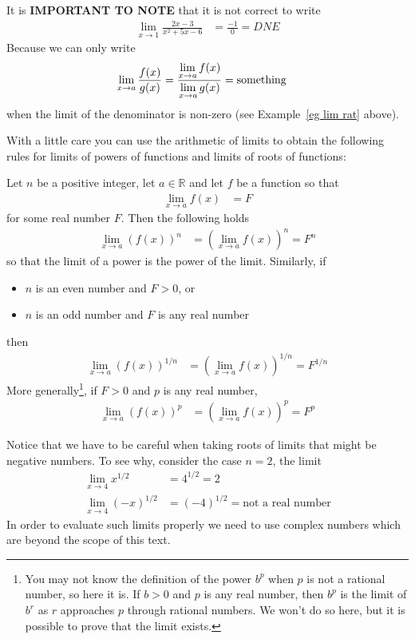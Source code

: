 It is \textbf{IMPORTANT TO NOTE} that it is not correct to write
\begin{align*}
\lim_{x \to 1} \frac{2x-3}{x^2+5x-6}
  &= \frac{-1}{0} = DNE
\end{align*}
Because we can only write
\begin{align*}
  \lim_{x \to a} \frac{f(x)}{g(x)} &= \frac{\displaystyle \lim_{x \to a} f(x)}{\displaystyle
\lim_{x \to a} g(x) } = \text{something}
\end{align*}
when the limit of the denominator is non-zero (see Example~\ref{eg lim rat} above).

With a little care you can use the arithmetic of limits to obtain the
following rules for limits of powers of functions and limits of roots of
functions:
\begin{theorem}
\label{thm lim powers}
  Let $n$ be a positive integer, let $a \in \mathbb{R}$ and let $f$ be a
function so that
\begin{align*}
  \lim_{x \to a} f(x) &= F
\end{align*}
  for some real number $F$. Then the following holds
\begin{align*}
  \lim_{x \to a} \left( f(x) \right)^n
  &= \left(\lim_{x \to a} f(x) \right)^n = F^n
\end{align*}
so that the limit of a power is the power of the limit. Similarly, if
\begin{itemize}
 \item $n$ is an even number and $F>0$, or
 \item $n$ is an odd number and $F$ is any real number
\end{itemize}
then
\begin{align*}
  \lim_{x \to a} \left( f(x) \right)^{1/n}
  &= \left(\lim_{x \to a} f(x) \right)^{1/n} = F^{1/n}
\end{align*}
More generally\footnote{You may not know the definition of the power
$b^p$ when $p$ is not a rational number, so here it is. If $b>0$ and $p$
is any real number, then $b^p$ is the limit of $b^r$ as $r$ approaches $p$ 
through rational numbers. We won't do so here, but it is possible to prove that the limit exists.}, if $F>0$ and $p$ is any real number,
\begin{align*}
  \lim_{x \to a} \left( f(x) \right)^p
  &= \left(\lim_{x \to a} f(x) \right)^p = F^p
\end{align*}
\end{theorem}
Notice that we have to be careful when taking roots of limits that might be
negative numbers. To see why, consider the case $n=2$, the limit
\begin{align*}
  \lim_{x \to 4} x^{1/2} &= 4^{1/2} = 2 \\
  \lim_{x \to 4} (-x)^{1/2} &= (-4)^{1/2} = \text{not a real number}
\end{align*}
In order to evaluate such limits properly we need to use complex numbers which
are beyond the scope of this text.

